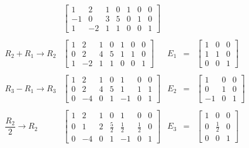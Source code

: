 \begin{enumerate}[\bfseries 1.]
	$$
	\begin{array}{rlrcl}
	    &
	    \left[
		\begin{array}{rrrr|rrr}
		    1 & 2 & 1 & 0 & 1 & 0 & 0 \\
		    -1 & 0 & 3 & 5 & 0 & 1 & 0 \\
		    1 & -2 & 1 & 1 & 0 & 0 & 1
		\end{array}
	    \right]
	    &&&\\\\
	    R_2+R_1\to R_2&
	    \left[
		\begin{array}{rrrr|rrr}
		    1 & 2 & 1 & 0 & 1 & 0 & 0 \\
		    0 & 2 & 4 & 5 & 1 & 1 & 0 \\
		    1 & -2 & 1 & 1 & 0 & 0 & 1
		\end{array}
	    \right]
	    &E_1&=&
	    \left[
		\begin{array}{rrr}
		    1&0&0\\
		    1&1&0\\
		    0&0&1
		\end{array}
	    \right]\\\\
	    R_3-R_1\to R_3&
	    \left[
		\begin{array}{rrrr|rrr}
		    1 & 2 & 1 & 0 & 1 & 0 & 0 \\
		    0 & 2 & 4 & 5 & 1 & 1 & 1 \\
		    0 & -4 & 0 & 1 & -1 & 0 & 1
		\end{array}
	    \right]
	    &E_2&=&
	    \left[
		\begin{array}{rrr}
		    1&0&0\\
		    0&1&0\\
		    -1&0&1
		\end{array}
	    \right]\\\\
	    \dfrac{R_2}{2}\to R_2&
	    \left[
		\begin{array}{rrrr|rrr}
		    1 & 2 & 1 & 0 & 1 & 0 & 0 \\
		    0 & 1 & 2 & \frac{5}{2} & \frac{1}{2} & \frac{1}{2} & 0 \\
		    0 & -4 & 0 & 1 & -1 & 0 & 1
		\end{array}
	    \right]
	    &E_3&=&
	    \left[
		\begin{array}{rrr}
		    1&0&0\\
		    0&\frac{1}{2}&0\\
		    0&0&1
		\end{array}
	    \right]\\\\

\end{array}$$
\end{enumerate}
